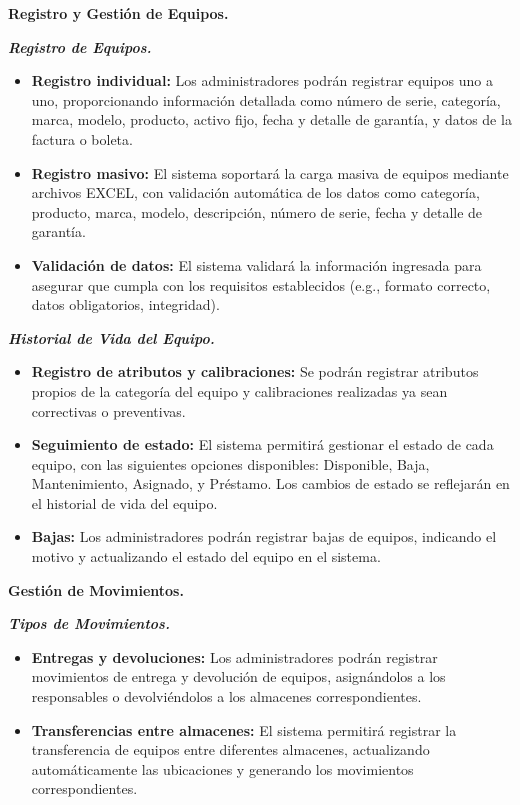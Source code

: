 \documentclass[stu, 12pt, letterpaper, donotrepeattitle, floatsintext, natbib]{apa7}
\begin{document}
\textbf{Registro y Gestión de Equipos.}

\textit{\textbf{Registro de Equipos.}}
\begin{itemize}
    \item\textbf{Registro individual: }Los administradores podrán registrar equipos uno a uno, proporcionando información detallada como número
          de serie, categoría, marca, modelo, producto, activo fijo, fecha y detalle de garantía, y datos de la factura o boleta.
    \item\textbf{Registro masivo: }El sistema soportará la carga masiva de equipos mediante archivos EXCEL, con validación automática de los
          datos como categoría, producto, marca, modelo, descripción, número de serie, fecha y detalle de garantía.
    \item\textbf{Validación de datos: }El sistema validará la información ingresada para asegurar que cumpla con los requisitos establecidos
          (e.g., formato correcto, datos obligatorios, integridad).
\end{itemize}

\textit{\textbf{Historial de Vida del Equipo.}}
\begin{itemize}
    \item\textbf{Registro de atributos y calibraciones: }Se podrán registrar atributos propios de la categoría del equipo y calibraciones
          realizadas ya sean correctivas o preventivas.
    \item\textbf{Seguimiento de estado: }El sistema permitirá gestionar el estado de cada equipo, con las siguientes opciones disponibles:
          Disponible, Baja, Mantenimiento, Asignado, y Préstamo. Los cambios de estado se reflejarán en el historial de vida del equipo.
    \item\textbf{Bajas: }Los administradores podrán registrar bajas de equipos, indicando el motivo y actualizando el estado del equipo en el
          sistema.
\end{itemize}

\textbf{Gestión de Movimientos.}

\textit{\textbf{Tipos de Movimientos.}}
\begin{itemize}
    \item\textbf{Entregas y devoluciones: }Los administradores podrán registrar movimientos de entrega y devolución de equipos, asignándolos a
          los responsables o devolviéndolos a los almacenes correspondientes.
    \item\textbf{Transferencias entre almacenes: }El sistema permitirá registrar la transferencia de equipos entre diferentes almacenes,
          actualizando automáticamente las ubicaciones y generando los movimientos correspondientes.
\end{itemize}
\end{document}
